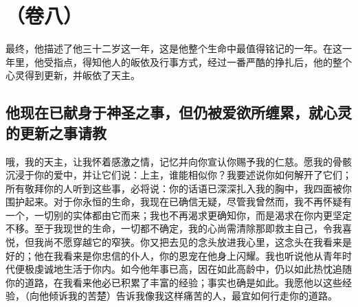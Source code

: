 
\section{（卷八）}

最终，他描述了他三十二岁这一年，这是他整个生命中最值得铭记的一年。在这一年里，他受指点，得知他人的皈依及行事方式，经过一番严酷的挣扎后，他的整个心灵得到更新，并皈依了天主。\par


\subsection{他现在已献身于神圣之事，但仍被爱欲所缠累，就心灵的更新之事请教}

哦，我的天主，让我怀着感激之情，记忆并向你宣认你赐予我的仁慈。愿我的骨骸沉浸于你的爱中，并让它们说：上主，谁能相似你？我要述说你如何解开了它们；所有敬拜你的人听到这些事，必将说：你的话语已深深扎入我的胸中，我四面被你围护起来。对于你永恒的生命，我现在已确信无疑，尽管我曾然而，我不再怀疑有一个，一切别的实体都由它而来；我也不再渴求更确知你，而是渴求在你内更坚定不移。至于我现世的生命，一切都不确定，我的心尚需清除那即救主自己，令我喜悦，但我尚不愿穿越它的窄狭。你又把去见的念头放进我心里，这念头在我看来是好的；他在我看来是你忠信的仆人，你的恩宠在他身上闪耀。我也听说他从青年时代便极虔诚地生活于你内。如今他年事已高，因在如此高龄中，仍以如此热忱追随你的道路，在我看来他必已积累了丰富的经验；事实也确是如此。我愿他以这些经验，（向他倾诉我的苦楚）告诉我像我这样痛苦的人，最宜如何行走你的道路。\par

